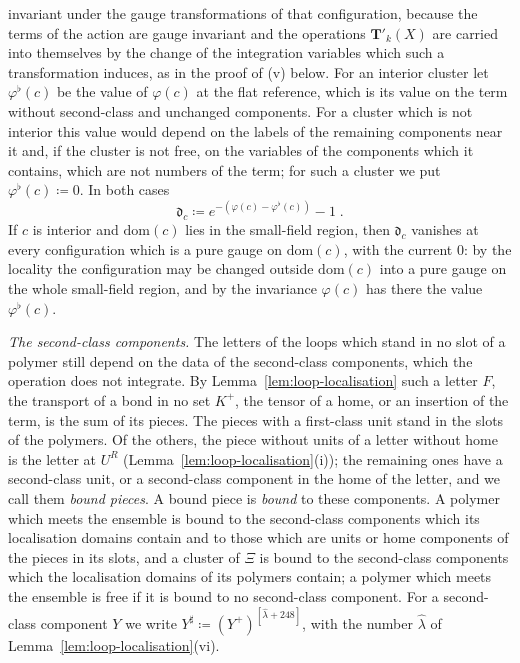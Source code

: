 \documentclass[11pt]{preprint}
\numberwithin{equation}{section}
\theoremstyle{definition}
\theoremstyle{remark}
\theoremstyle{plain}
\begin{document}
invariant under the gauge transformations of that configuration, because the terms of the action are gauge invariant \cite[(2.23), p.~258; (2.30), p.~260]{BalabanCRE} and the operations $\mathbf T'_k(X)$ are carried into themselves by the change of the integration variables which such a transformation induces, as in the proof of (v) below. For an interior cluster let $\varphi^\flat(c)$ be the value of $\varphi(c)$ at the flat reference, which is its value on the term without second-class and unchanged components. For a cluster which is not interior this value would depend on the labels of the remaining components near it and, if the cluster is not free, on the variables of the components which it contains, which are not numbers of the term; for such a cluster we put $\varphi^\flat(c) \coloneqq 0$. In both cases
\begin{equation}\label{eq:cluster-deviation}
    \mathfrak d_c \coloneqq e^{-(\varphi(c) - \varphi^\flat(c))} - 1\;.
\end{equation}
If $c$ is interior and $\mathrm{dom}(c)$ lies in the small-field region, then $\mathfrak d_c$ vanishes at every configuration which is a pure gauge on $\mathrm{dom}(c)$, with the current $0$: by the locality the configuration may be changed outside $\mathrm{dom}(c)$ into a pure gauge on the whole small-field region, and by the invariance $\varphi(c)$ has there the value $\varphi^\flat(c)$.

\emph{The second-class components.} The letters of the loops which stand in no slot of a polymer still depend on the data of the second-class components, which the operation does not integrate. By Lemma~\ref{lem:loop-localisation} such a letter $F$, the transport of a bond in no set $K^+$, the tensor of a home, or an insertion of the term, is the sum of its pieces. The pieces with a first-class unit stand in the slots of the polymers. Of the others, the piece without units of a letter without home is the letter at $U^R$ (Lemma~\ref{lem:loop-localisation}(i)); the remaining ones have a second-class unit, or a second-class component in the home of the letter, and we call them \emph{bound pieces}. A bound piece is \emph{bound} to these components. A polymer which meets the ensemble is bound to the second-class components which its localisation domains contain and to those which are units or home components of the pieces in its slots, and a cluster of $\Xi$ is bound to the second-class components which the localisation domains of its polymers contain; a polymer which meets the ensemble is free if it is bound to no second-class component. For a second-class component $Y$ we write $Y^\sharp \coloneqq (Y^+)^{[\hat\lambda + 248]}$, with the number $\hat\lambda$ of Lemma~\ref{lem:loop-localisation}(vi).
\end{document}
